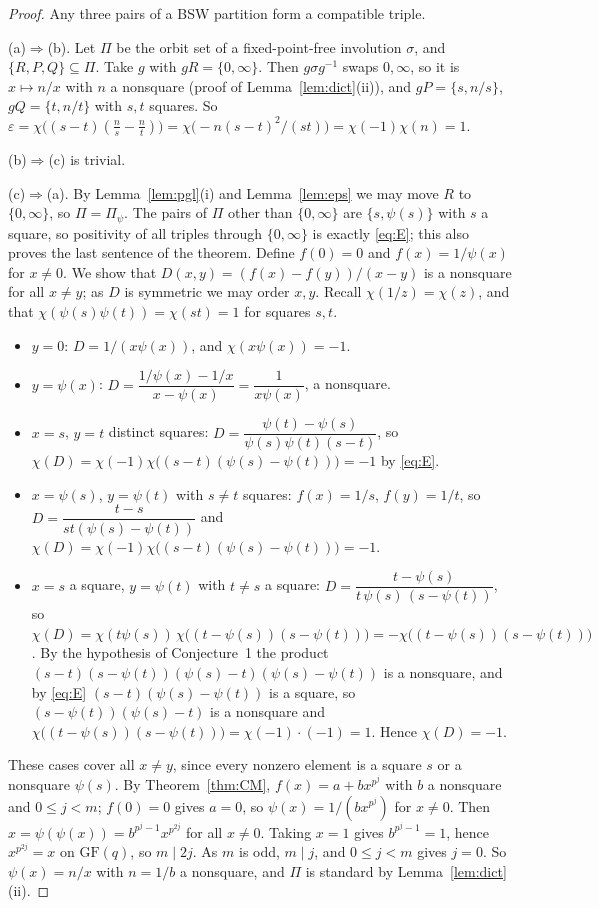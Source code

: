 \documentclass[11pt,a4paper]{article}
\theoremstyle{definition}
\theoremstyle{remark}
\newcommand{\GF}{\mathrm{GF}}
\begin{document}
\begin{proof}
Any three pairs of a BSW partition form a compatible triple.

(a)$\Rightarrow$(b). Let $\Pi$ be the orbit set of a fixed-point-free involution $\sigma$, and $\{R,P,Q\}\subseteq\Pi$.
Take $g$ with $gR=\{0,\infty\}$. Then $g\sigma g^{-1}$ swaps $0,\infty$, so it is $x\mapsto n/x$ with $n$ a nonsquare
(proof of Lemma~\ref{lem:dict}(ii)), and $gP=\{s,n/s\}$, $gQ=\{t,n/t\}$ with $s,t$ squares. So
$\varepsilon=\chi\bigl((s-t)(\tfrac ns-\tfrac nt)\bigr)=\chi\bigl(-n(s-t)^2/(st)\bigr)=\chi(-1)\chi(n)=1$.

(b)$\Rightarrow$(c) is trivial.

(c)$\Rightarrow$(a). By Lemma~\ref{lem:pgl}(i) and Lemma~\ref{lem:eps} we may move $R$ to $\{0,\infty\}$, so
$\Pi=\Pi_\psi$. The pairs of $\Pi$ other than $\{0,\infty\}$ are $\{s,\psi(s)\}$ with $s$ a square, so positivity of all
triples through $\{0,\infty\}$ is exactly \eqref{eq:E}; this also proves the last sentence of the theorem. Define
$f(0)=0$ and $f(x)=1/\psi(x)$ for $x\ne0$. We show that $D(x,y)=(f(x)-f(y))/(x-y)$ is a nonsquare for all $x\ne y$; as
$D$ is symmetric we may order $x,y$. Recall $\chi(1/z)=\chi(z)$, and that $\chi(\psi(s)\psi(t))=\chi(st)=1$ for squares
$s,t$.
\begin{itemize}
\item $y=0$: $D=1/(x\psi(x))$, and $\chi(x\psi(x))=-1$.
\item $y=\psi(x)$: $D=\dfrac{1/\psi(x)-1/x}{x-\psi(x)}=\dfrac1{x\psi(x)}$, a nonsquare.
\item $x=s$, $y=t$ distinct squares: $D=\dfrac{\psi(t)-\psi(s)}{\psi(s)\psi(t)(s-t)}$, so
$\chi(D)=\chi(-1)\chi\bigl((s-t)(\psi(s)-\psi(t))\bigr)=-1$ by \eqref{eq:E}.
\item $x=\psi(s)$, $y=\psi(t)$ with $s\ne t$ squares: $f(x)=1/s$, $f(y)=1/t$, so
$D=\dfrac{t-s}{st(\psi(s)-\psi(t))}$ and $\chi(D)=\chi(-1)\chi\bigl((s-t)(\psi(s)-\psi(t))\bigr)=-1$.
\item $x=s$ a square, $y=\psi(t)$ with $t\ne s$ a square: $D=\dfrac{t-\psi(s)}{t\,\psi(s)\,(s-\psi(t))}$, so
$\chi(D)=\chi(t\psi(s))\,\chi\bigl((t-\psi(s))(s-\psi(t))\bigr)=-\chi\bigl((t-\psi(s))(s-\psi(t))\bigr)$. By the hypothesis
of Conjecture~1 the product $(s-t)(s-\psi(t))(\psi(s)-t)(\psi(s)-\psi(t))$ is a nonsquare, and by \eqref{eq:E}
$(s-t)(\psi(s)-\psi(t))$ is a square, so $(s-\psi(t))(\psi(s)-t)$ is a nonsquare and
$\chi\bigl((t-\psi(s))(s-\psi(t))\bigr)=\chi(-1)\cdot(-1)=1$. Hence $\chi(D)=-1$.
\end{itemize}
These cases cover all $x\ne y$, since every nonzero element is a square $s$ or a nonsquare $\psi(s)$. By
Theorem~\ref{thm:CM}, $f(x)=a+bx^{p^j}$ with $b$ a nonsquare and $0\le j<m$; $f(0)=0$ gives $a=0$, so
$\psi(x)=1/(bx^{p^j})$ for $x\ne0$. Then $x=\psi(\psi(x))=b^{p^j-1}x^{p^{2j}}$ for all $x\ne0$. Taking $x=1$ gives
$b^{p^j-1}=1$, hence $x^{p^{2j}}=x$ on $\GF(q)$, so $m\mid 2j$. As $m$ is odd, $m\mid j$, and $0\le j<m$ gives $j=0$.
So $\psi(x)=n/x$ with $n=1/b$ a nonsquare, and $\Pi$ is standard by Lemma~\ref{lem:dict}(ii).
\end{proof}
\end{document}
